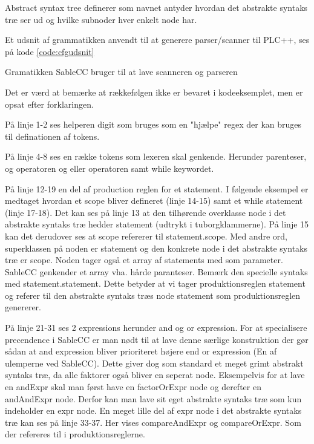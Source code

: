 Abstract syntax tree definerer som navnet antyder hvordan det abstrakte syntaks træ ser ud og hvilke subnoder hver enkelt node har.

Et udsnit af grammatikken anvendt til at generere parser/scanner til PLC++, ses på kode \ref{code:cfgudsnit}

Gramatikken SableCC bruger til at lave scanneren og parseren


\noindent Det er værd at bemærke at rækkefølgen ikke er bevaret i kodeeksemplet, men er opsat efter forklaringen.

På linje 1-2 ses helperen digit som bruges som en "hjælpe" regex der kan bruges til definationen af tokens.

På linje 4-8 ses en række tokens som lexeren skal genkende. Herunder parenteser, og operatoren og eller operatoren samt while keywordet.

På linje 12-19 en del af production reglen for et statement. I følgende eksempel er medtaget hvordan et scope bliver defineret (linje 14-15) samt et while statement (linje 17-18). Det kan ses på linje 13 at den tilhørende overklasse node i det abstrakte syntaks træ hedder statement (udtrykt i tuborgklammerne). På linje 15 kan det derudover ses at scope refererer til statement.scope. Med andre ord, superklassen på noden er statement og den konkrete node i det abstrakte syntaks træ er scope. Noden tager også et array af statements med som parameter. SableCC genkender et array vha. hårde paranteser. Bemærk den specielle syntaks med statement.statement. Dette betyder at vi tager produktionsreglen statement og referer til den abstrakte syntaks træs node statement som produktionsreglen genererer.

På linje 21-31 ses 2 expressions herunder and og or expression. For at specialisere precendence i SableCC er man nødt til at lave denne særlige konstruktion der gør sådan at and expression bliver prioriteret højere end or expression (En af ulemperne ved SableCC). Dette giver dog som standard et meget grimt abstrakt syntaks træ, da alle faktorer også bliver en seperat node. Eksempelvis for at lave en andExpr skal man først have en factorOrExpr node og derefter en andAndExpr node. Derfor kan man lave sit eget abstrakte syntaks træ som kun indeholder en expr node. En meget lille del af expr node i det abstrakte syntaks træ kan ses på linje 33-37. Her vises compareAndExpr og compareOrExpr. Som der refereres til i produktionsreglerne.

